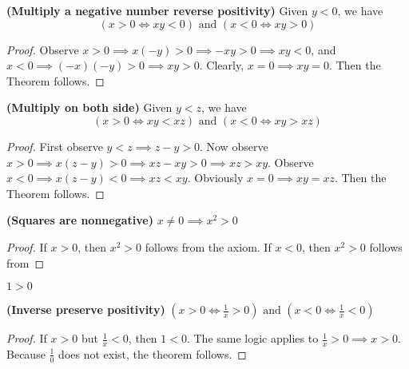 \documentclass{report}
\begin{document}
\begin{theorem}
\label{1.2.3}
  
\textbf{(Multiply a negative number reverse positivity)} Given $y<0$, we have
\begin{equation}
  (x>0\iff xy<0)\text{ and }(x<0\iff xy>0)
\end{equation}
\end{theorem}
\begin{proof}
Observe $x>0\implies x(-y)>0\implies -xy>0\implies xy<0$, and 
$x<0\implies (-x)(-y)>0\implies xy>0$. Clearly, $x=0\implies xy=0$. Then the Theorem follows. 
\end{proof}
\begin{theorem}
\label{1.2.4}
\textbf{(Multiply on both side)}  Given $y<z$, we have
\begin{equation}
  (x>0\iff xy<xz)\text{ and }(x<0\iff xy>xz)
\end{equation}
\end{theorem}
\begin{proof}
First observe $y<z\implies z-y>0$. Now observe $x>0\implies x(z-y)>0\implies xz-xy>0\implies xz>xy$. 
Observe  $x<0\implies x(z-y)<0\implies xz<xy$. Obviously $x=0\implies  xy=xz$. Then the Theorem follows.
\end{proof}
\begin{theorem}
\label{1.2.5}
  \textbf{(Squares are nonnegative)} $x\neq 0\implies x^2>0$
\end{theorem}
\begin{proof}
  If $x>0$, then $x^2>0$ follows from the axiom. If $x<0$, then $x^2>0$ follows from 
\end{proof}

\begin{corollary}
\label{1.2.6}
$1>0$
\end{corollary}

\begin{theorem}
\label{1.2.7}
\textbf{(Inverse preserve positivity)} $(x>0\iff \frac{1}{x}>0)\text{ and }(x<0\iff \frac{1}{x}<0)$ 
\end{theorem}
\begin{proof}
If $x>0$ but $\frac{1}{x}<0$, then $1<0$. The same logic applies to  $\frac{1}{x}>0\implies x>0$. Because $\frac{1}{0}$ does not exist, the theorem follows.
\end{proof}
\end{document}

